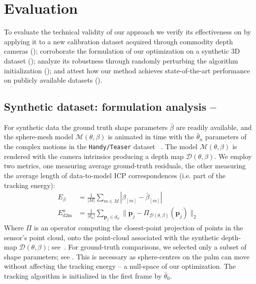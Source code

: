 \section{Evaluation}
To evaluate the technical validity of our approach we verify its effectiveness on by applying it to a new calibration dataset acquired through commodity depth cameras (); corroborate the formulation of our optimization on a synthetic 3D dataset (); analyze its robustness through randomly perturbing the algorithm initialization (); and attest how our method achieves state-of-the-art performance on publicly available datasets ().

\subsection{Synthetic dataset: formulation analysis -- }
\label{sec:analysis}
For synthetic data the ground truth shape parameters $\bar\beta$ are readily available, and the sphere-mesh model $\mathcal{M}(\theta,\beta)$ is animated in time with the $\bar\theta_n$ parameters of the complex motions in the \texttt{Handy/Teaser} dataset~\cite{tkach2016sphere} .
The model $\mathcal{M}(\theta,\beta)$ is rendered with the camera intrinsics producing a depth map $\mathcal{D}(\theta,\beta)$. We employ two metrics, one measuring average ground-truth residuals, the other measuring the average length of data-to-model ICP correspondences (i.e. part of the tracking energy):
% 
\begin{align}
E_{\beta} &= \tfrac{1}{|M|} \sum_{m \in M} \left| \beta_{[m]} - \bar\beta_{[m]} \right|
\label{eq:metricgt}
\\
E_\text{d2m}^n &= \tfrac{1}{|d_n|} \sum_{\mathbf{p}_j \in d_n} \| \mathbf{p}_j - \Pi_{\mathcal{D}(\theta,\beta)}(\mathbf{p}_j) \|_2
\label{eq:metricd2m}
\end{align}
% 
Where $\Pi$ is an operator computing the closest-point projection of points in the sensor's point cloud, onto the point-cloud associated with the synthetic depth-map $\mathcal{D}(\theta,\beta)$; see~\cite{tkach2016sphere}. For ground-truth comparisons, we selected only a subset  of shape parameters; see . This is necessary as sphere-centres on the palm can move without affecting the tracking energy -- a null-space of our optimization. The tracking algorithm is initialized in the first frame by $\bar\theta_0$.
